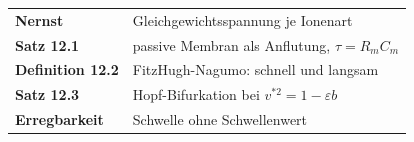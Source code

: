 \begin{merksatz}
\begin{center}
\renewcommand{\arraystretch}{1.5}
\begin{tabular}{@{}P{3.0cm}P{5.6cm}@{}}
\toprule
\textbf{Nernst} & Gleichgewichtsspannung je Ionenart\\
\textbf{Satz 12.1} & passive Membran als Anflutung, $\tau = R_mC_m$\\
\textbf{Definition 12.2} & FitzHugh-Nagumo: schnell und langsam\\
\textbf{Satz 12.3} & Hopf-Bifurkation bei $v^{*2} = 1-\varepsilon b$\\
\textbf{Erregbarkeit} & Schwelle ohne Schwellenwert\\
\bottomrule
\end{tabular}
\end{center}

\begin{center}
\begin{minipage}{0.88\textwidth}
\end{minipage}
\end{center}
\end{merksatz}
